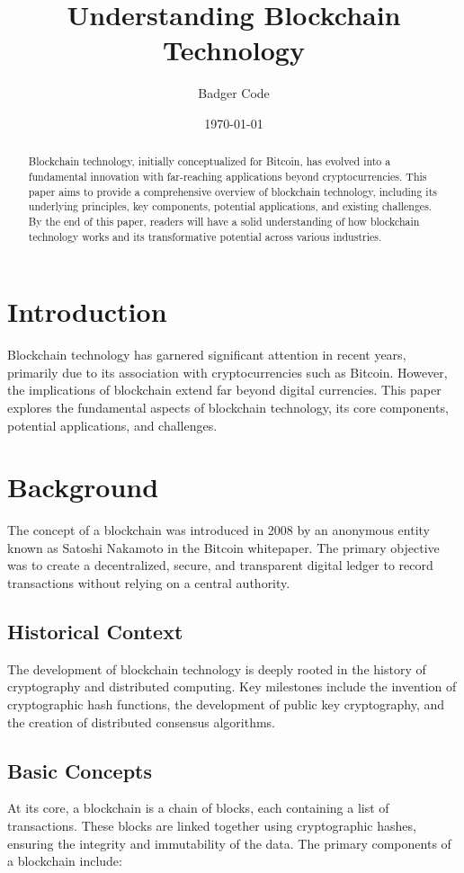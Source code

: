 \documentclass[12pt]{article}
\title{Understanding Blockchain Technology}
\author{Badger Code}
\date{\today}
\begin{document}
\maketitle

\begin{abstract}
Blockchain technology, initially conceptualized for Bitcoin, has evolved into a fundamental innovation with far-reaching applications beyond cryptocurrencies. This paper aims to provide a comprehensive overview of blockchain technology, including its underlying principles, key components, potential applications, and existing challenges. By the end of this paper, readers will have a solid understanding of how blockchain technology works and its transformative potential across various industries.
\end{abstract}

\section{Introduction}
Blockchain technology has garnered significant attention in recent years, primarily due to its association with cryptocurrencies such as Bitcoin. However, the implications of blockchain extend far beyond digital currencies. This paper explores the fundamental aspects of blockchain technology, its core components, potential applications, and challenges.

\section{Background}
The concept of a blockchain was introduced in 2008 by an anonymous entity known as Satoshi Nakamoto in the Bitcoin whitepaper. The primary objective was to create a decentralized, secure, and transparent digital ledger to record transactions without relying on a central authority.

\subsection{Historical Context}
The development of blockchain technology is deeply rooted in the history of cryptography and distributed computing. Key milestones include the invention of cryptographic hash functions, the development of public key cryptography, and the creation of distributed consensus algorithms.

\subsection{Basic Concepts}
At its core, a blockchain is a chain of blocks, each containing a list of transactions. These blocks are linked together using cryptographic hashes, ensuring the integrity and immutability of the data. The primary components of a blockchain include:
\end{document}
